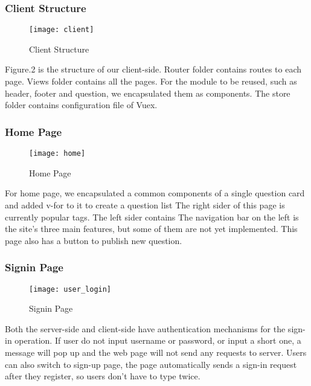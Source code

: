 \documentclass[11pt]{article}
\begin{document}
\subsubsection{Client Structure}
\begin{figure}[htp]
    \centering
    \texttt{[image: client]}
    \caption{Client Structure}
    \label{fig:galaxy}
\end{figure}

Figure.2 is the structure of our client-side. Router folder contains routes to each page. Views folder contains all the pages. For the module to be reused, such as header, footer and question, we  encapsulated them as components. The store folder contains configuration file of Vuex.

\subsubsection{Home Page}
\begin{figure}[htp]
    \centering
    \texttt{[image: home]}
    \caption{Home Page}
    \label{fig:galaxy}
\end{figure}
For home page, we encapsulated a common components of a single question card and added v-for to it to create a question list
The right sider of this page is currently popular tags. The left sider contains The navigation bar on the left is the site's three main features, but some of them are not yet implemented. This page also has a button to publish new question.

\subsubsection{Signin Page}
\begin{figure}[htp]
    \centering
    \texttt{[image: user\_login]}
    \caption{Signin Page}
    \label{fig:galaxy}
\end{figure}
Both the server-side and client-side have authentication mechanisms for the sign-in operation. If user do not input username or password, or input a short one, a message will pop up and the web page will not send any requests to server. Users can also switch to sign-up page, the page automatically sends a sign-in request after they register, so users don't have to type twice.
\end{document}
